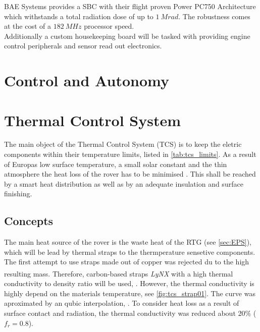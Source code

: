 BAE Systems provides a SBC with their flight proven Power PC750 Architecture which withstands a total radiation dose of up to $1\ Mrad$. The robustness comes at the cost of a $182\ MHz$ processor speed. \\

Additionally a custom housekeeping board will be tasked with providing engine control peripherals and sensor read out electronics. 
 
\clearpage

\section{Control and Autonomy} \label{sec:ControlandAutonomy}

\clearpage

\section{Thermal Control System} \label{sec:thermalcontrol}
The main object of the Thermal Control System (TCS) is to keep the eletric components within their temperature limits, listed in \autoref{tab:tcs_limits}.
As a result of Europas low surface temperature, a small solar constant and the thin atmosphere the heat loss of the rover has to be minimised  \cite{Europa}.
This shall be reached by a smart heat distribution as well as by an adequate insulation and surface finishing.

\subsection{Concepts}
The main heat source of the rover is the waste heat of the RTG (see \autoref{sec:EPS}), which will be lead by thermal straps to the thermperature sensetive components.
The first attempt to use straps made out of copper was rejected du to the high resulting mass.
Therefore, carbon-based straps \textit{LyNX}\textsuperscript{\tiny\textregistered} with a high thermal conductivity to density ratio will be used, \cite{ref_tcs_01}.
However, the thermal conductivity is highly depend on the materials temperature, see \autoref{fig:tcs_strap01}.
The curve was aproximated by an qubic interpolation, .
To consider heat loss as a result of surface contact and radiation, the thermal conductivity was reduced about 20\% ($f_{r}=0.8$).


